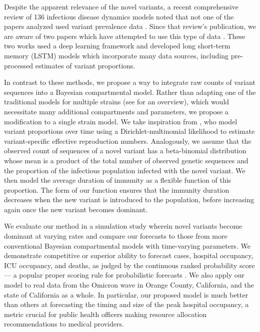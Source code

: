 Despite the apparent relevance of the novel variants, a recent comprehensive review of 136 infectious disease dynamics models noted that not one of the papers analyzed used variant prevalence data \citep{Nixon2022evaluation}.
Since that review's publication, we are aware of two papers which have attempted to use this type of data \citep{Du2023Incorporating, Rashed2022Covid}.
These two works used a deep learning framework and developed long short-term memory (LSTM) models which incorporate many data sources, including pre-processed estimates of variant proportions.

In contrast to these methods, we propose a way to integrate raw counts of variant sequences into a Bayesian compartmental model.
Rather than adapting one of the traditional models for multiple strains (see \citet{Kucharski2016Capturing} for an overview), which would necessitate many additional compartments and parameters, we propose a modification to a single strain model.
We take inspiration from \citet{Figgins2021variant}, who model variant proportions over time using a Dirichlet-multinomial likelihood to estimate variant-specific effective reproduction numbers.
Analogously, we assume that the observed count of sequences of a novel variant has a beta-binomial distribution whose mean is a product of the total number of observed genetic sequences and the proportion of the infectious population infected with the novel variant.
We then model the average duration of immunity as a flexible function of this proportion.
The form of our function ensures that the immunity duration decreases when the new variant is introduced to the population, before increasing again once the new variant becomes dominant.

We evaluate our method in a simulation study wherein novel variants become dominant at varying rates and compare our forecasts to those from more conventional Bayesian compartmental models with time-varying parameters.
We demonstrate competitive or superior ability to forecast cases, hospital occupancy, ICU occupancy, and deaths, as judged by the continuous ranked probability score --- a popular proper scoring rule for probabilistic forecasts \citep{gneiting2007strictly}.
We also apply our model to real data from the Omicron wave in Orange County, California, and the state of California as a whole.
In particular, our proposed model is much better than others at forecasting the timing and size of the peak hospital occupancy, a metric crucial for public health officers making resource allocation recommendations to medical providers.


